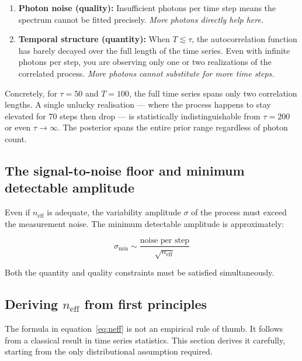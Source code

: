 \documentclass[11pt, a4paper]{article}
\begin{document}
\begin{enumerate}
    \item \textbf{Photon noise (quality):} Insufficient photons per time step means
    the spectrum cannot be fitted precisely. \emph{More photons directly help here.}

    \item \textbf{Temporal structure (quantity):} When $T \lesssim \tau$, the
    autocorrelation function has barely decayed over the full length of the time series.
    Even with infinite photons per step, you are observing only one or two realizations
    of the correlated process. \emph{More photons cannot substitute for more time steps.}
\end{enumerate}

Concretely, for $\tau = 50$ and $T = 100$, the full time series spans only two
correlation lengths. A single unlucky realisation --- where the process happens to stay
elevated for 70 steps then drop --- is statistically indistinguishable from $\tau = 200$
or even $\tau \to \infty$. The posterior spans the entire prior range regardless of
photon count.

\subsection{The signal-to-noise floor and minimum detectable amplitude}

Even if $n_\mathrm{eff}$ is adequate, the variability amplitude $\sigma$ of the
process must exceed the measurement noise. The minimum detectable amplitude is
approximately:

\begin{equation}
    \sigma_\mathrm{min} \sim \frac{\text{noise per step}}{\sqrt{n_\mathrm{eff}}}
\end{equation}

Both the quantity and quality constraints must be satisfied simultaneously.

\subsection{Deriving $n_\mathrm{eff}$ from first principles}
\label{subsec:neff_derivation}

The formula in equation~\eqref{eq:neff} is not an empirical rule of thumb.
It follows from a classical result in time series statistics.
This section derives it carefully, starting from the only distributional assumption
required.
\end{document}
